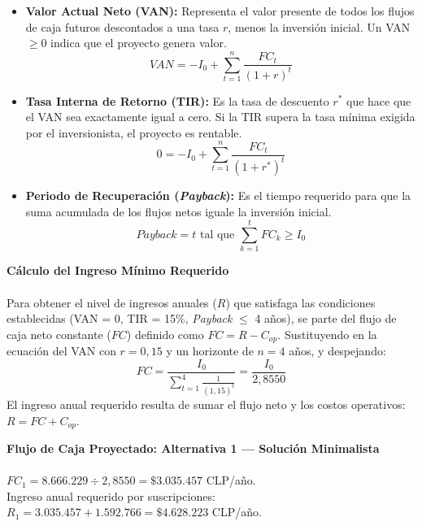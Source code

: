 \documentclass[12pt]{article}
\begin{document}
\begin{itemize}
    \item \textbf{Valor Actual Neto (VAN):} Representa el valor presente de todos los flujos de caja futuros descontados a una tasa $r$, menos la inversión inicial. Un VAN $\geq 0$ indica que el proyecto genera valor.
    \begin{equation}
        VAN = -I_0 + \sum_{t=1}^{n} \frac{FC_t}{(1+r)^t}
    \end{equation}

    \item \textbf{Tasa Interna de Retorno (TIR):} Es la tasa de descuento $r^*$ que hace que el VAN sea exactamente igual a cero. Si la TIR supera la tasa mínima exigida por el inversionista, el proyecto es rentable.
    \begin{equation}
        0 = -I_0 + \sum_{t=1}^{n} \frac{FC_t}{(1+r^*)^t}
    \end{equation}

    \item \textbf{Periodo de Recuperación (\textit{Payback}):} Es el tiempo requerido para que la suma acumulada de los flujos netos iguale la inversión inicial.
    \begin{equation}
        Payback = t \text{ tal que } \sum_{k=1}^{t} FC_k \geq I_0
    \end{equation}
\end{itemize}

\textbf{Cálculo del Ingreso Mínimo Requerido}
\\\\
Para obtener el nivel de ingresos anuales ($R$) que satisfaga las condiciones establecidas (VAN = 0, TIR = 15\%, \textit{Payback} $\leq$ 4 años), se parte del flujo de caja neto constante ($FC$) definido como $FC = R - C_{op}$. Sustituyendo en la ecuación del VAN con $r = 0{,}15$ y un horizonte de $n = 4$ años, y despejando:
\begin{equation}
    FC = \frac{I_0}{\displaystyle\sum_{t=1}^{4} \frac{1}{(1{,}15)^t}} = \frac{I_0}{2{,}8550}
\end{equation}
El ingreso anual requerido resulta de sumar el flujo neto y los costos operativos: $R = FC + C_{op}$.

\newpage
\textbf{Flujo de Caja Proyectado: Alternativa 1 --- Solución Minimalista}
\\\\
$FC_1 = 8.666.229 \div 2{,}8550 = \$3.035.457$ CLP/año.\\
Ingreso anual requerido por suscripciones: 
\\$R_1 = 3.035.457 + 1.592.766 = \$4.628.223$ CLP/año.
\end{document}
